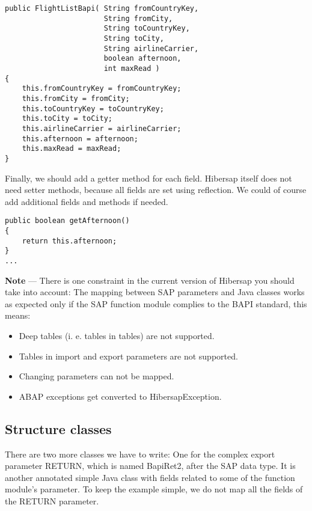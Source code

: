 \begin{lstlisting}[caption=The constructor]
public FlightListBapi( String fromCountryKey,
                       String fromCity,
                       String toCountryKey,
                       String toCity,
                       String airlineCarrier,
                       boolean afternoon,
                       int maxRead )
{
    this.fromCountryKey = fromCountryKey;
    this.fromCity = fromCity;
    this.toCountryKey = toCountryKey;
    this.toCity = toCity;
    this.airlineCarrier = airlineCarrier;
    this.afternoon = afternoon;
    this.maxRead = maxRead;
}
\end{lstlisting}

Finally, we should add a getter method for each field.
Hibersap itself does not need setter methods, because all fields are set using reflection.
We could of course add additional fields and methods if needed.

\begin{lstlisting}[caption=The getter methods]
public boolean getAfternoon()
{
    return this.afternoon;
}
...
\end{lstlisting}

\HRule

\textbf{Note} --- There is one constraint in the current version of Hibersap you should take into account: The mapping
between SAP parameters and Java classes works as expected only if the SAP function module complies to the BAPI standard,
this means:
\begin{itemize}
  \item Deep tables (i. e. tables in tables) are not supported.
  \item Tables in import and export parameters are not supported.
  \item Changing parameters can not be mapped.
  \item ABAP exceptions get converted to HibersapException.
\end{itemize}

\HRule


\subsection{Structure classes}

There are two more classes we have to write:
One for the complex export parameter RETURN, which is named BapiRet2, after the SAP data type.
It is another annotated simple Java class with fields related to some of the function module's parameter.
To keep the example simple, we do not map all the fields of the RETURN parameter.


